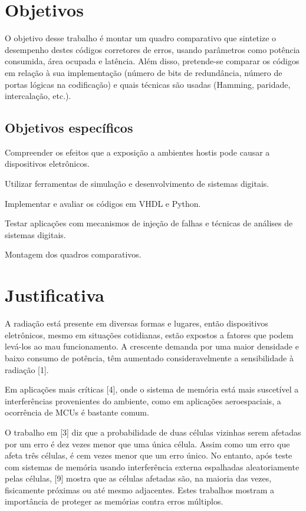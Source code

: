 \section{Objetivos}

O objetivo desse trabalho é montar um quadro comparativo que sintetize o desempenho destes códigos corretores de erros, usando parâmetros como potência consumida, área ocupada e latência. Além disso, pretende-se comparar os códigos em relação à sua implementação (número de bits de redundância, número de portas lógicas na codificação) e quais técnicas são usadas (Hamming, paridade, intercalação, etc.).


\subsection{Objetivos específicos}

Compreender os efeitos que a exposição a ambientes hostis pode causar a dispositivos eletrônicos.

Utilizar ferramentas de simulação e desenvolvimento de sistemas digitais.

Implementar e avaliar os códigos em VHDL e Python.

Testar aplicações com mecanismos de injeção de falhas e técnicas de análises de sistemas digitais.

Montagem dos quadros comparativos.

\section{Justificativa}

A radiação está presente em diversas formas e lugares, então dispositivos eletrônicos, mesmo em situações cotidianas, estão expostos a fatores que podem levá-los ao mau funcionamento. A crescente demanda por uma maior densidade e baixo consumo de potência, têm aumentado consideravelmente a sensibilidade à radiação [1].

Em aplicações mais críticas [4], onde o sistema de memória está mais suscetível a interferências provenientes do ambiente, como em aplicações aeroespaciais, a ocorrência de MCUs é bastante comum.

O trabalho em [3] diz que a probabilidade de duas células vizinhas serem afetadas por um erro é dez vezes menor que uma única célula. Assim como um erro que afeta três células, é cem vezes menor que um erro único. No entanto, após teste com sistemas de memória usando interferência externa espalhadas aleatoriamente pelas células, [9] mostra que as células afetadas são, na maioria das vezes, fisicamente próximas ou até mesmo adjacentes. Estes trabalhos mostram a importância de proteger as memórias contra erros múltiplos.

